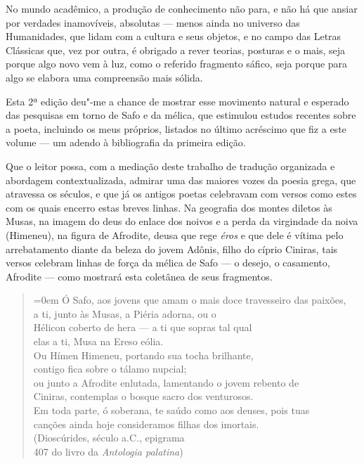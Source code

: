 No mundo acadêmico, a produção de conhecimento não para, e não há que
ansiar por verdades inamovíveis, absolutas --- menos ainda no universo
das Humanidades, que lidam com a cultura e seus objetos,
e no campo das Letras Clássicas que, vez por outra, é obrigado a rever
teorias, posturas e o mais, seja porque algo novo vem à luz, como o referido fragmento sáfico, seja porque para algo se elabora uma compreensão mais
sólida.

Esta 2ª edição deu"-me a chance de mostrar esse movimento natural e
esperado das pesquisas em torno de Safo e da mélica, que estimulou
estudos recentes sobre a poeta, incluindo os meus próprios, listados no
último acréscimo que fiz a este volume --- um adendo à bibliografia
da primeira edição.

Que o leitor possa, com a mediação deste trabalho de tradução organizada
e abordagem contextualizada, admirar uma das maiores vozes da poesia grega, que
atravessa os séculos, e que já os antigos poetas celebravam com versos
como estes com os quais encerro estas breves linhas.
Na geografia dos montes diletos às Musas, na imagem do deus do enlace dos noivos e a perda da virgindade da noiva (Himeneu), na figura de Afrodite, deusa que rege \textit{éros} e que dele é vítima pelo arrebatamento diante da beleza do jovem Adônis, filho do cíprio Ciniras, tais versos celebram linhas de força da mélica de Safo --- o desejo, o casamento, Afrodite --- como mostrará esta coletânea de seus fragmentos.

\begin{quote}\parindent=0em
Ó Safo, aos jovens que amam o mais doce travesseiro das paixões,\\
a ti, junto às Musas, a Piéria adorna, ou o\\
Hélicon coberto de hera --- a ti que sopras tal qual\\
elas a ti, Musa na Ereso eólia.\\
Ou Hímen Himeneu, portando sua tocha brilhante,\\
contigo fica sobre o tálamo nupcial;\\
ou junto a Afrodite enlutada, lamentando o jovem rebento de\\
Ciniras, contemplas o bosque sacro dos venturosos.\\
Em toda parte, ó soberana, te saúdo como aos deuses, pois tuas\\
canções ainda hoje consideramos filhas dos imortais.\\
\mbox{}\hfill{}(Dioscúrides, século  a.C., epigrama\\
\mbox{}\hfill{}407 do livro  da \emph{Antologia palatina})
\end{quote}


